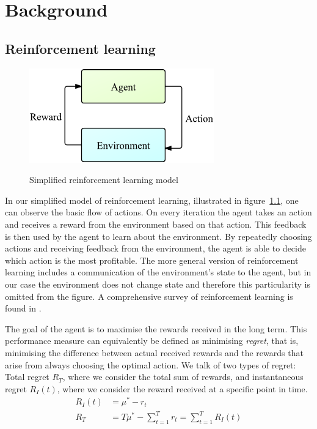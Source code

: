 \chapter{Background}
\label{ch:background}

\section{Reinforcement learning}
\begin{figure}[htbp]
    \centering
    \includegraphics[width=8cm]{images/ReinforcementLearning}
    \label{fig:rlearn}
    \caption{Simplified reinforcement learning model}
\end{figure}

In our simplified model of reinforcement learning, illustrated in figure~\ref{fig:rlearn}, one can observe the basic flow of actions. On every iteration the agent takes an action and receives a reward from the environment based on that action.
This feedback is then used by the agent to learn about the environment.
By repeatedly choosing actions and receiving feedback from the environment, the agent is able to decide which action is the most profitable.
The more general version of reinforcement learning includes a communication of the environment's state to the agent, but in our case the environment does not change state and therefore this particularity is omitted from the figure.
A comprehensive survey of reinforcement learning is found in \cite{Kaelbling1996}.

The goal of the agent is to maximise the rewards received in the long term.
This performance measure can equivalently be defined as minimising \emph{regret}, that is, minimising the difference between actual received rewards and the rewards that arise from always choosing the optimal action.
We talk of two types of regret:
Total regret $R_T$, where we consider the total sum of rewards, and instantaneous regret $R_I(t)$, where we consider the reward received at a specific point in time.
\begin{align*}
    R_I(t) &= \mu^* - r_t \\
    R_T &= T\mu^* - \sum_{t=1}^{T}{r_t} = \sum_{t = 1}^{T}{R_I(t)} 
\end{align*}

